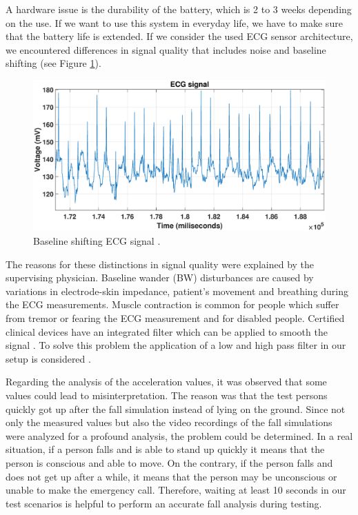 \documentclass[10pt,journal,compsoc]{IEEEtran}
\begin{document}
A hardware issue is the durability of the battery, which is 2 to 3 weeks depending on the use. If we want to use this system in everyday life, we have to make sure that the battery life is extended. If we consider the used ECG sensor architecture, we encountered differences in signal quality that includes noise and baseline shifting (see Figure \ref{fig:ECGBaselineShifting}). 
\begin{figure}[!ht]
	\centering
	\includegraphics[scale=0.2425]{Images/NormalECG1.eps}
	\caption[Measured ECG signal]{Baseline shifting ECG signal \cite{FatimaMasterThesis}.}
	\label{fig:ECGBaselineShifting}
\end{figure}

The reasons for these distinctions in signal quality were explained by the supervising physician. Baseline wander (BW) disturbances are caused by variations in electrode-skin impedance, patient's movement and breathing during the ECG measurements. Muscle contraction is common for people which suffer from tremor or fearing the ECG measurement and for disabled people. Certified clinical devices have an integrated filter which can be applied to smooth the signal \cite{ECGNoise,DrNicoletteWagner}. To solve this problem the application of a low and high pass filter in our setup is considered \cite{FatimaMasterThesis}.

Regarding the analysis of the acceleration values, it was observed that some values could lead to misinterpretation. The reason was that the test persons quickly got up after the fall simulation instead of lying on the ground.
Since not only the measured values but also the video recordings of the fall simulations were analyzed for a profound analysis, the problem could be determined. In a real situation, if a person falls and is able to stand up quickly it means that the person is conscious and able to move. On the contrary, if the person falls and does not get up after a while, it means that the person may be unconscious or unable to make the emergency call.  Therefore, waiting at least 10 seconds in our test scenarios is helpful to perform an accurate fall analysis during testing.
\end{document}
